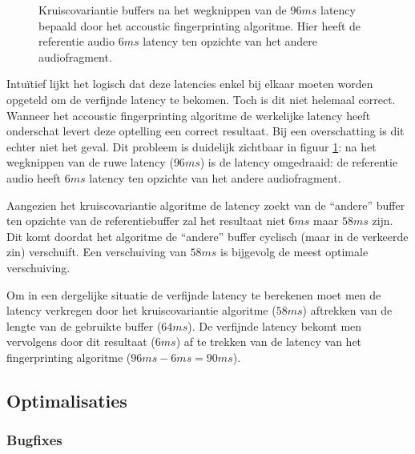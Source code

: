 \begin{figure}[h!]
	\captionsetup{width=0.7\textwidth}
	\caption[Kruiscovariantie buffers]{Kruiscovariantie buffers na het wegknippen van de $ 96 ms $ latency bepaald door het accoustic fingerprinting algoritme. Hier heeft de referentie audio $ 6 ms $ latency ten opzichte van het andere audiofragment.   }
	\begin{center}
		\advance\parskip0.3cm
		
	\end{center}
	\label{crosscovariance2}
\end{figure}

Intuïtief lijkt het logisch dat deze latencies enkel bij elkaar moeten worden opgeteld om de verfijnde latency te bekomen. Toch is dit niet helemaal correct. Wanneer het accoustic fingerprinting algoritme de werkelijke latency heeft onderschat levert deze optelling een correct resultaat. Bij een overschatting is dit echter niet het geval. Dit probleem is duidelijk zichtbaar in figuur \ref{crosscovariance2}: na het wegknippen van de ruwe latency ($96 ms$) is de latency omgedraaid: de referentie audio heeft $ 6 ms $ latency ten opzichte van het andere audiofragment. 

Aangezien het kruiscovariantie algoritme de latency zoekt van de ``andere'' buffer ten opzichte van de referentiebuffer zal het resultaat niet $6 ms$ maar $ 58 ms $ zijn. Dit komt doordat het algoritme de ``andere'' buffer cyclisch (maar in de verkeerde zin) verschuift. Een verschuiving van $ 58 ms $ is bijgevolg de meest optimale verschuiving.

Om in een dergelijke situatie de verfijnde latency te berekenen moet men de latency verkregen door het kruiscovariantie algoritme ($ 58 ms$) aftrekken van de lengte van de gebruikte buffer ($ 64 ms $). De verfijnde latency bekomt men vervolgens door dit resultaat ($ 6 ms $) af te trekken van de latency van het fingerprinting  algoritme ($ 96 ms - 6 ms = 90 ms $).


\subsection{Optimalisaties}

\subsubsection{Bugfixes}

